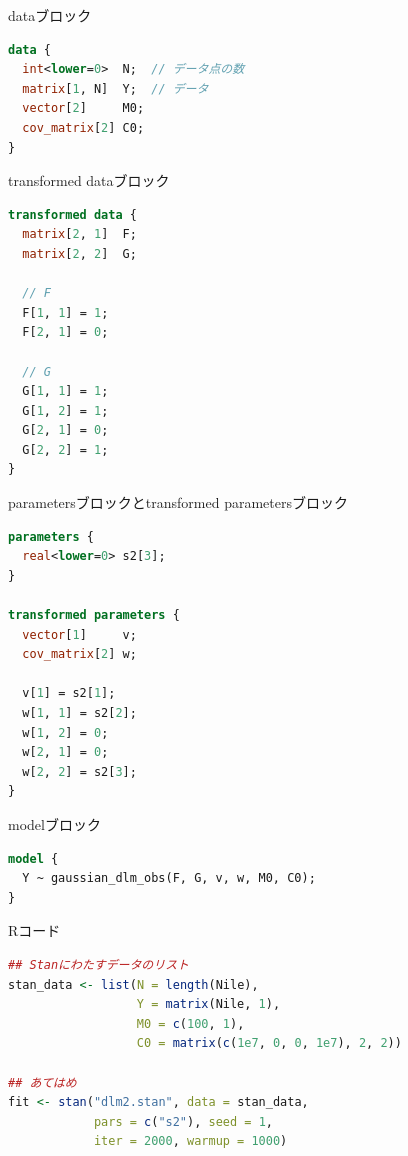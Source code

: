 \documentclass[dvipdfmx,12pt]{beamer}
\begin{document}
\begin{frame}[fragile]{dataブロック}
  \begin{lstlisting}[language=Stan]
data {
  int<lower=0>  N;  // データ点の数
  matrix[1, N]  Y;  // データ
  vector[2]     M0;
  cov_matrix[2] C0;
}
  \end{lstlisting}
\end{frame}

\begin{frame}[fragile]{transformed dataブロック}
  \begin{lstlisting}[language=Stan]
transformed data {
  matrix[2, 1]  F;
  matrix[2, 2]  G;

  // F
  F[1, 1] = 1;
  F[2, 1] = 0;

  // G
  G[1, 1] = 1;
  G[1, 2] = 1;
  G[2, 1] = 0;
  G[2, 2] = 1;
}
  \end{lstlisting}
\end{frame}

\begin{frame}[fragile]{parametersブロックとtransformed parametersブロック}
  \begin{lstlisting}[language=Stan]
parameters {
  real<lower=0> s2[3];
}

transformed parameters {
  vector[1]     v;
  cov_matrix[2] w;

  v[1] = s2[1];
  w[1, 1] = s2[2];
  w[1, 2] = 0;
  w[2, 1] = 0;
  w[2, 2] = s2[3];
}
  \end{lstlisting}
\end{frame}

\begin{frame}[fragile]{modelブロック}
  \begin{lstlisting}[language=Stan]
model {
  Y ~ gaussian_dlm_obs(F, G, v, w, M0, C0);
}
  \end{lstlisting}
\end{frame}

\begin{frame}[fragile]{Rコード}
  \begin{lstlisting}[language=R]
## Stanにわたすデータのリスト
stan_data <- list(N = length(Nile),
                  Y = matrix(Nile, 1),
                  M0 = c(100, 1),
                  C0 = matrix(c(1e7, 0, 0, 1e7), 2, 2))

## あてはめ
fit <- stan("dlm2.stan", data = stan_data,
            pars = c("s2"), seed = 1,
            iter = 2000, warmup = 1000)
  \end{lstlisting}
\end{frame}
\end{document}

